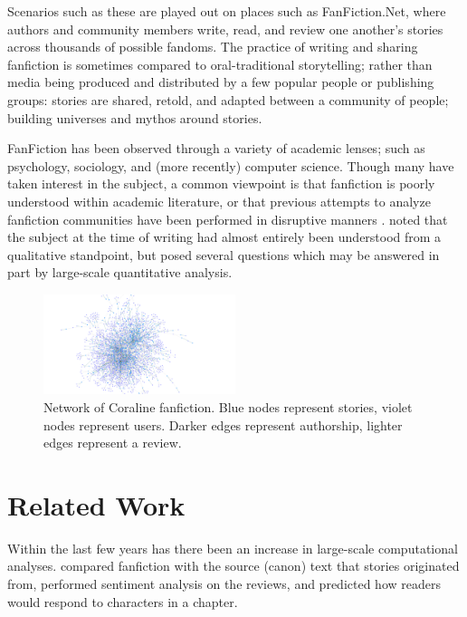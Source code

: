 \documentclass[letterpaper]{article}
\begin{document}
Scenarios such as these are played out on places such as FanFiction.Net, where authors and community members write, read, and review one another's stories across thousands of possible fandoms.  The practice of writing and sharing fanfiction is sometimes compared to oral-traditional storytelling; rather than media being produced and distributed by a few popular people or publishing groups: stories are shared, retold, and adapted between a community of people; building universes and mythos around stories.

FanFiction has been observed through a variety of academic lenses; such as psychology, sociology, and (more recently) computer science. Though many have taken interest in the subject, a common viewpoint is that fanfiction is poorly understood within academic literature, or that previous attempts to analyze fanfiction communities have been performed in disruptive manners \cite{larsen2011fandom}. \cite{barnes2015fanfiction} noted that the subject at the time of writing had almost entirely been understood from a qualitative standpoint, but posed several questions which may be answered in part by large-scale quantitative analysis.

\begin{figure}
    \centering
    \includegraphics[width=0.5\textwidth]{Coraline_network.png}
    \caption{Network of Coraline fanfiction. Blue nodes represent stories, violet nodes represent users. Darker edges represent authorship, lighter edges represent a review.}
    \label{fig:coraline_network}
\end{figure}

\section{Related Work}

Within the last few years has there been an increase in large-scale computational analyses. \cite{milli2016beyond} compared fanfiction with the source (canon) text that stories originated from, performed sentiment analysis on the reviews, and predicted how readers would respond to characters in a chapter.
\end{document}
